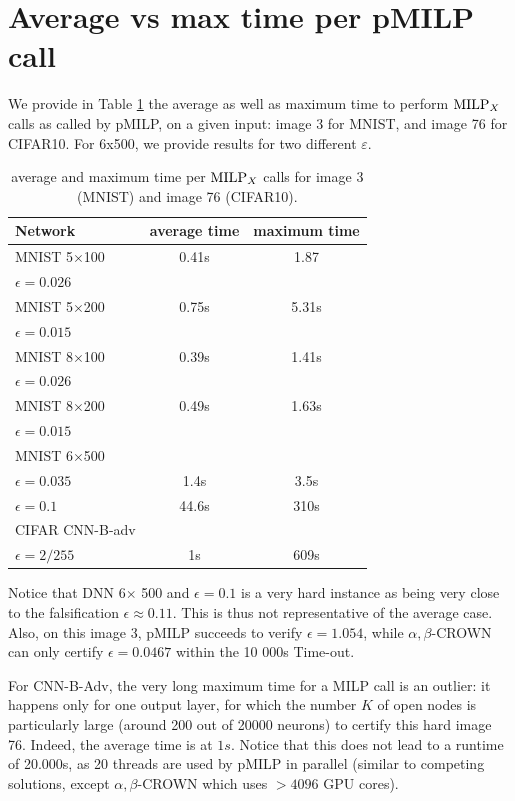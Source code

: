 \section{Average vs max time per pMILP call}

We provide in Table \ref{table112} the average as well as maximum time to perform ${\textrm{MILP}}_X$ calls as called by pMILP, on a given input: image 3 for MNIST, and image 76 for CIFAR10. 
For 6x500, we provide results for two different $\varepsilon$.


\begin{table}[h!]
	\centering
	\begin{tabular}{||l|c|c||}
		\hline
		Network & average time & maximum time \\ \hline
		MNIST 5$\times$100 & 0.41s & 1.87 \\
		$\epsilon = 0.026$ &  & \\  \hline
		MNIST 5$\times$200 &  0.75s & 5.31s \\ 
		$\epsilon = 0.015$ & & \\  \hline
		MNIST 8$\times$100 & 0.39s & 1.41s \\
		$\epsilon = 0.026$ & &  \\  \hline
		MNIST 8$\times$200 & 0.49s & 1.63s \\ 
		$\epsilon = 0.015$ & & \\  \hline
		MNIST 6$\times$500 & &   \\ 
		$\epsilon = 0.035$ & 1.4s & 3.5s \\ 
		$\epsilon = 0.1$ & 44.6s & 310s \\  \hline 
		CIFAR CNN-B-adv &  & \\
		$\epsilon = 2/255$& 1s & 609s \\ \hline \hline
	\end{tabular}
	\caption{average and maximum time per ${\textrm{MILP}}_X$ calls for image 3 (MNIST) and image 76 (CIFAR10).}
	\label{table112}
\end{table}

Notice that DNN 6$\times$ 500 and $\epsilon=0.1$ is a very hard instance as being very close to the falsification $\epsilon \approx 0.11$. This is thus not representative of the average case. Also,  on this image 3, pMILP succeeds to verify $\epsilon= 1.054$, while $\alpha,\beta$-CROWN can only certify $\epsilon = 0.0467$ within the 10 000s Time-out.

For CNN-B-Adv, the very long maximum time for a MILP call is an outlier: it happens only for one output layer, for which the number $K$ of open nodes is particularly large (around 200 out of 20000 neurons) to certify this hard image 76. Indeed, the average time is at $1s$. Notice that this does not lead to a runtime of 20.000s, as 20 threads are used by pMILP 
in parallel (similar to competing solutions, except $\alpha,\beta$-CROWN which uses $>4096$ GPU cores).













